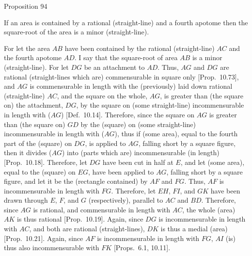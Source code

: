 
\begin{center}
{\large Proposition 94}
\end{center}

If an area is contained by a rational (straight-line)
and a fourth apotome then the square-root of the area is a minor (straight-line).

\epsfysize=1.3in
\centerline{}

For let the area $AB$ have been contained by the rational (straight-line)
$AC$ and the fourth apotome $AD$. I say that the square-root of area $AB$
is a minor (straight-line).
For let $DG$ be an attachment to $AD$. Thus, $AG$ and $DG$ are rational (straight-lines which are) commensurable in square only [Prop.~10.73], and $AG$ is commensurable
in length with the (previously) laid down rational (straight-line) $AC$, and
the square on the whole, $AG$, is greater than (the square on) the attachment,
$DG$, by the square on (some straight-line) incommensurable
in length with ($AG$) [Def.~10.14]. Therefore,
since the square on $AG$ is greater than (the square on)  $GD$ by the
(square) on (some straight-line) incommensurable in length with ($AG$),
thus if (some area), equal to the fourth part of the (square) on $DG$,
is applied to $AG$, falling short by a square figure, then it divides
($AG$) into (parts which are) incommensurable (in length) 
[Prop.~10.18]. Therefore, let $DG$ have been
cut in half at $E$, and let (some area), equal to the (square) on
$EG$, have been applied to $AG$, falling short by a square figure, and
let it be the (rectangle contained) by $AF$ and $FG$. Thus, $AF$
is incommensurable in length with $FG$. Therefore, let $EH$, $FI$, and $GK$
have been drawn through $E$, $F$, and $G$ (respectively), parallel
to $AC$ and $BD$. Therefore, since $AG$ is rational, and
commensurable in length with $AC$, the whole (area) $AK$
is thus rational [Prop.~10.19]. Again, since $DG$ is incommensurable in length with
$AC$, and both are rational (straight-lines), $DK$ is thus
a medial (area) [Prop.~10.21]. Again, since
$AF$ is incommensurable in length with $FG$, $AI$ (is) thus also
incommensurable with $FK$ [Props.~6.1, 10.11].

